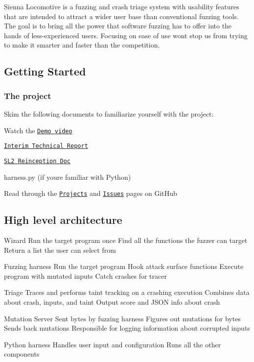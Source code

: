 Sienna Locomotive is a fuzzing and crash triage system with usability features that are intended to attract a wider user base than conventional fuzzing tools. The goal is to bring all the power that software fuzzing has to offer into the hands of less-\/experienced users. Focusing on ease of use won\textquotesingle{}t stop us from trying to make it smarter and faster than the competition.

\subsection*{Getting Started}

\subsubsection*{The project}

Skim the following documents to familiarize yourself with the project\+:
\begin{DoxyItemize}
\item Watch the \href{https://drive.google.com/open?id=1njGgRrrfNanYSuaMy5nwLi1rw2bS1rMt}{\tt Demo video}
\item \href{https://docs.google.com/document/d/1zTUHlu-y_ZLT08saJp0qguYXC69F6CskMPZVLs48IVc/edit}{\tt Interim Technical Report}
\item \href{https://docs.google.com/document/d/1RwvknJk9PPgecLcsQI1SiXje9SdKB3OuOoSniIDvy68/edit}{\tt S\+L2 Reinception Doc}
\item harness.\+py (if you\textquotesingle{}re familiar with Python)
\item Read through the \href{https://github.com/trailofbits/sienna-locomotive/projects/6}{\tt Projects} and \href{https://github.com/trailofbits/sienna-locomotive/issues}{\tt Issues} pages on Git\+Hub
\end{DoxyItemize}

\subsection*{High level architecture}


\begin{DoxyCode}
Wizard
  Run the target program once
  Find all the functions the fuzzer can target
  Return a list the user can select from

Fuzzing harness
  Run the target program
  Hook attack surface functions
  Execute program with mutated inputs
  Catch crashes for tracer

Triage
  Traces and performs taint tracking on a crashing execution
  Combines data about crash, inputs, and taint
  Output score and JSON info about crash

Mutation Server
  Sent bytes by fuzzing harness
  Figures out mutations for bytes
  Sends back mutations
  Responsible for logging information about corrupted inputs

Python harness
  Handles user input and configuration
  Runs all the other components
\end{DoxyCode}


